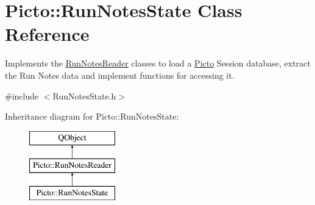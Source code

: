 \hypertarget{class_picto_1_1_run_notes_state}{\section{Picto\-:\-:Run\-Notes\-State Class Reference}
\label{class_picto_1_1_run_notes_state}
}


Implements the \hyperlink{class_picto_1_1_run_notes_reader}{Run\-Notes\-Reader} classes to load a \hyperlink{namespace_picto}{Picto} Session database, extract the Run Notes data and implement functions for accessing it.  




{\ttfamily \#include $<$Run\-Notes\-State.\-h$>$}

Inheritance diagram for Picto\-:\-:Run\-Notes\-State\-:\begin{figure}[H]
\begin{center}
\leavevmode
\includegraphics[height=3.000000cm]{class_picto_1_1_run_notes_state}
\end{center}
\end{figure}
